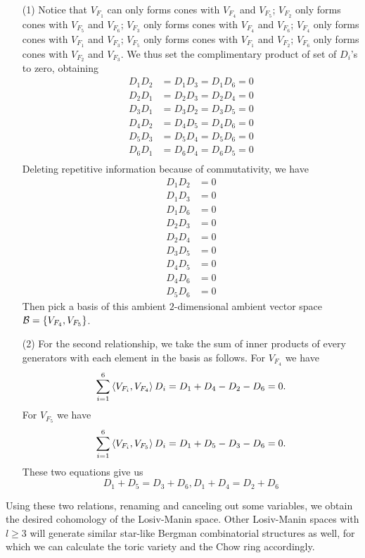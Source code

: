     \begin{enumerate}
    \item[(1)]
	Notice that $V_{F_1}$ can only forms cones with $V_{F_4}$ and $V_{F_5}$;
	$V_{F_2}$ only forms cones with $V_{F_5}$ and $V_{F_6}$;
	$V_{F_3}$ only forms cones with $V_{F_4}$ and $V_{F_6}$;
	$V_{F_4}$ only forms cones with $V_{F_1}$ and $V_{F_3}$;
	$V_{F_5}$ only forms cones with $V_{F_1}$ and $V_{F_2}$;
	$V_{F_6}$ only forms cones with $V_{F_2}$ and $V_{F_3}$.
	We thus set the complimentary product of set of $D_i$'s to zero,
	obtaining
	\begin{align*}
		D_1 D_2 &= D_1 D_3 = D_1 D_6 = 0 \\
		D_2 D_1 &= D_2 D_3 = D_2 D_4 = 0 \\
		D_3 D_1 &= D_3 D_2 = D_3 D_5 = 0 \\
		D_4 D_2 &= D_4 D_5 = D_4 D_6 = 0 \\
		D_5 D_3 &= D_5 D_4 = D_5 D_6 = 0 \\
		D_6 D_1 &= D_6 D_4 = D_6 D_5 = 0 \\
	\end{align*}
	Deleting repetitive information because of commutativity,
	we have 
	\begin{align*}
		D_1 D_2 &= 0 \\
		D_1 D_3 &= 0 \\
		D_1 D_6 &= 0 \\
		D_2 D_3 &= 0 \\
		D_2 D_4 &= 0 \\
		D_3 D_5 &= 0 \\
		D_4 D_5 &= 0 \\
		D_4 D_6 &= 0 \\
		D_5 D_6 &= 0 
 	\end{align*}
	Then pick a basis of this ambient $2$-dimensional 
	ambient vector space $\mathcal{B} = \{V_{F_4}, V_{F_5}\}$.
	
	\item[(2)]
	For the second relationship,
	we take the sum of inner products of every generators with 
	each element in the basis as follows.
	For $V_{F_4}$ we have
	\[
		\sum\limits_{i=1}^6 \left< V_{F_i}, V_{F_4} \right> D_i = 
		D_1 + D_4 - D_2 - D_6 = 0.
	\]
	For $V_{F_5}$ we have
	\[
		\sum\limits_{i=1}^6 \left< V_{F_i}, V_{F_5} \right> D_i = 
		D_1 + D_5 - D_3 - D_6 = 0.
	\]
	These two equations give us
	\[
	D_1 + D_5 = D_3 + D_6, D_1 + D_4 = D_2 + D_6
	\]
    \end{enumerate}
    Using these two relations, renaming and canceling out some variables, 
    we obtain the desired cohomology of the Losiv-Manin space. 
    Other Losiv-Manin spaces with $l \ge 3$ will generate similar star-like Bergman combinatorial structures as well,
    for which we can calculate the toric variety and the Chow ring accordingly. 
    
    
